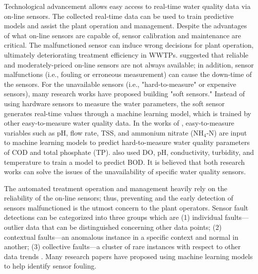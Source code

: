 Technological advancement allows easy access to real-time water quality data via on-line sensors. The collected real-time data can be used to train predictive models and assist the plant operation and management. Despite the advantages of what on-line sensors are capable of, sensor calibration and maintenance are critical. The malfunctioned sensor can induce wrong decisions for plant operation, ultimately deteriorating treatment efficiency in WWTPs. \citet{haimiShallWeUse2015} suggested that reliable and moderately-priced on-line sensors are not always available; in addition, sensor malfunctions (i.e., fouling or erroneous measurement) can cause the down-time of the sensors. For the unavailable sensors (i.e., "hard-to-measure" or expensive sensors), many research works have proposed building "soft sensors." Instead of using hardware sensors to measure the water parameters, the soft sensor generates real-time values through a machine learning model, which is trained by other easy-to-measure water quality data. In the works of \citet{wangExplicitInterpretableNonlinear2019}, easy-to-measure variables such as pH, flow rate, TSS, and ammonium nitrate (NH$_4$-N) are input to machine learning models to predict hard-to-measure water quality parameters of COD and total phosphate (TP). \citet{pattnaikMachineLearningBased2021} also used DO, pH, conductivity, turbidity, and temperature to train a model to predict BOD. It is believed that both research works can solve the issues of the unavailability of specific water quality sensors. 

The automated treatment operation and management heavily rely on the reliability of the on-line sensors; thus, preventing and the early detection of sensors malfunctioned is the utmost concern to the plant operators. Sensor fault detections can be categorized into three groups which are (1) individual faults--- outlier data that can be distinguished concerning other data points; (2) contextual faults---an anomalous instance in a specific context and normal in another; (3) collective faults---a cluster of rare instances with respect to other data trends \citep{chandolaAnomalyDetectionSurvey2009}. Many research papers have proposed using machine learning models to help identify sensor fouling.

